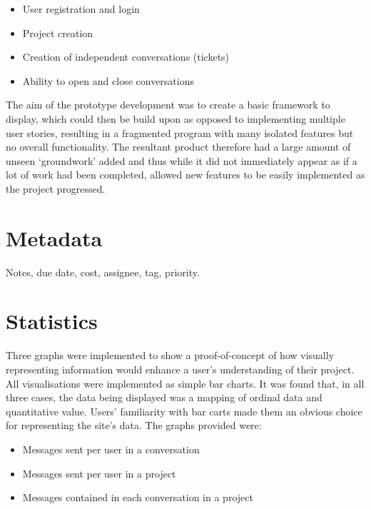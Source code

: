 \documentclass[a4paper]{l3proj}
\begin{document}
\begin{itemize}
\item User registration and login
\item Project creation
\item Creation of independent conversations (tickets)
\item Ability to open and close conversations
\end{itemize}

The aim of the prototype development was to create a basic framework to display, which could then be build upon as opposed to implementing multiple user stories, resulting in a fragmented program with many isolated features but no overall functionality.  The resultant product therefore had a large amount of unseen ‘groundwork’ added and thus while it did not immediately appear as if a lot of work had been completed, allowed new features to be easily implemented as the project progressed. 

\section{Metadata}
\label{metadata}

Notes, due date, cost, assignee, tag, priority.

\section{Statistics}
\label{statistics}

Three graphs were implemented to show a proof-of-concept of how visually representing information would enhance a user’s understanding of their project. 
All visualisations were implemented as simple bar charts. It was found that, in all three cases, the data being displayed was a mapping of ordinal data and quantitative value. Users’ familiarity with bar carts made them an obvious choice for representing the site’s data. 
The graphs provided were:

\begin{itemize}
\item Messages sent per user in a conversation
\item Messages sent per user in a project
\item Messages contained in each conversation in a project
\end{itemize}
\end{document}
